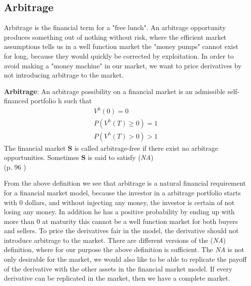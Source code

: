 \subsection{Arbitrage}
Arbitrage is the financial term for a "free lunch". An arbitrage opportunity produces something out of nothing without risk, where the efficient market assumptions tells us in a well function market the "money pumps" cannot exist for long, because they would quickly be corrected by exploitation. In order to avoid making a "money machine" in our market, we want to price derivatives by not introducing arbitrage to the market.  
\theoremstyle{definition}
\begin{definition}{\textbf{Arbitrage}:}
An arbitrage possibility on a financial market is an admissible self-financed portfolio h such that
\begin{equation}\label{Arbitrage}
\begin{split}
V^{h}(0)=0\\
P(V^{h}(T)\geq 0)=1\\
P(V^{h}(T)>0)>1
\end{split}
\end{equation}
The financial market $\bm{S}$ is called arbitrage-free if there exist no arbitrage opportunities. Sometimes $\bm{S}$ is said to satisfy (\textit{NA})\\
(p. 96 \parencite{finKont})
\end{definition}
From the above definition we see that arbitrage is a natural financial requirement for a financial market model, because the investor in a arbitrage portfolio starts with 0 dollars, and without injecting any money, the investor is certain of not losing any money. In addition he has a positive probability by ending up with more than 0 at maturity this cannot be a well function market for both buyers and sellers. To price the derivatives fair in the model, the derivative should not introduce arbitrage to the market. There are different versions of the (\textit{NA}) definition, where for our purpose the above definition is sufficient. The \textit{NA} is not only desirable for the market, we would also like to be able to replicate the payoff of the derivative with the other assets in the financial market model. If every derivative can be replicated in the market, then we have a complete market. 


